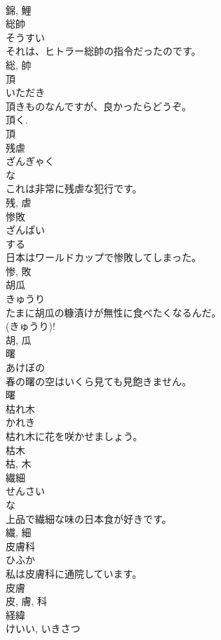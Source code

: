 \documentclass[8pt]{extreport}
\begin{document}
\begin{CJK}{UTF8}{min}
\\	錦, 鯉	
\\	総帥	
\\	そうすい	
\\	それは、ヒトラー総帥の指令だったのです。	
\\	総, 帥	
\\	頂	
\\	いただき	
\\	頂きものなんですが、良かったらどうぞ。	
\\	頂く. 
\\	頂	
\\	残虐	
\\	ざんぎゃく	
\\	な 
\\	これは非常に残虐な犯行です。	
\\	残, 虐	
\\	惨敗	
\\	ざんぱい	
\\	する 
\\	日本はワールドカップで惨敗してしまった。	
\\	惨, 敗	
\\	胡瓜	
\\	きゅうり	
\\	たまに胡瓜の糠漬けが無性に食べたくなるんだ。	
\\	(きゅうり)! 
\\	胡, 瓜	
\\	曙	
\\	あけぼの	
\\	春の曙の空はいくら見ても見飽きません。	
\\	曙	
\\	枯れ木	
\\	かれき	
\\	枯れ木に花を咲かせましょう。	
\\	枯木 
\\	枯, 木	
\\	繊細	
\\	せんさい	
\\	な 
\\	上品で繊細な味の日本食が好きです。	
\\	繊, 細	
\\	皮膚科	
\\	ひふか	
\\	私は皮膚科に通院しています。	
\\	皮膚 
\\	皮, 膚, 科	
\\	経緯	
\\	けいい, いきさつ	

\end{CJK}
\end{document}
